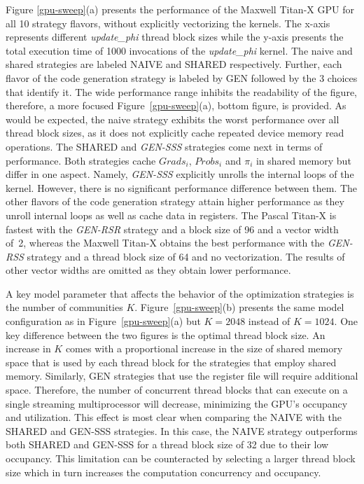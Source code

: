 Figure \ref{gpu-sweep}(a) presents the performance of the Maxwell \mbox{Titan-X} GPU
for all 10 strategy flavors, without explicitly vectorizing the kernels. The
x-axis represents different \textit{update\_phi} thread block sizes while the y-axis presents
the total execution time of 1000 invocations of the \textit{update\_phi} kernel. The
naive and shared strategies are labeled NAIVE and SHARED respectively. Further,
each flavor of the code generation strategy is labeled by GEN followed by the 3
choices that identify it.
%
The wide performance range inhibits the readability of the figure,
therefore, a more focused Figure~\ref{gpu-sweep}(a), bottom figure, is provided. As would
be expected, the naive strategy exhibits the worst performance over all
thread block
sizes, as it does not explicitly cache repeated device memory read operations.
The SHARED and \textit{GEN-SSS} strategies come next in terms of performance.
Both strategies cache $Grads_i$, $Probs_i$ and $\pi_i$ in shared memory but
differ in one aspect. Namely, \textit{GEN-SSS} explicitly unrolls the internal
loops of the kernel. However, there is no significant performance difference
between them. The other flavors of the code generation strategy attain higher
performance as they unroll internal loops as well as cache data in
registers. The Pascal Titan-X is fastest with the \textit{GEN-RSR} strategy and a
block size of 96 and a vector width of~2, whereas
the Maxwell Titan-X obtains the best performance with the \textit{GEN-RSS}
strategy and a thread block size of 64 and no vectorization. The results of other
vector widths
are omitted as they obtain lower performance.

A key model parameter that affects the behavior of the optimization strategies
is the number of communities $K$. Figure~\ref{gpu-sweep}(b) presents the
same model configuration as in Figure~\ref{gpu-sweep}(a) but $K=2048$
instead of $K=1024$. One key difference between the two figures is the optimal
thread block size. An increase in $K$ comes with a proportional increase in
the size of shared memory space that is used by each thread block for the
strategies that employ shared memory. Similarly, GEN strategies that use the
register file will require additional space. Therefore, the number of
concurrent thread blocks that can execute on a single streaming multiprocessor
will decrease, minimizing the GPU's occupancy and utilization. This effect is
most clear when comparing the NAIVE with the SHARED and GEN-SSS strategies. In
this case, the NAIVE strategy outperforms both SHARED and GEN-SSS for a
thread block
size of 32 due to their low occupancy. This limitation can be counteracted by
selecting a larger thread block size which in turn increases the computation
concurrency and occupancy.

